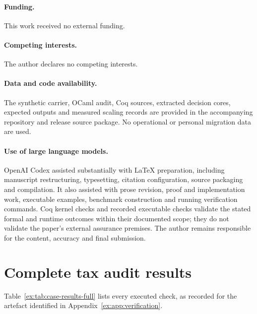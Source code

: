 \documentclass[smallextended,envcountsect,envcountsame,natbib]{svjour3}
\begin{document}
\paragraph{Funding.} This work received no external funding.
\paragraph{Competing interests.} The author declares no competing interests.
\paragraph{Data and code availability.} The synthetic carrier, OCaml audit, Coq sources, extracted decision cores, expected outputs and measured scaling records are provided in the accompanying repository and release source package. No operational or personal migration data are used.
\paragraph{Use of large language models.} OpenAI Codex assisted substantially with LaTeX preparation, including manuscript restructuring, typesetting, citation configuration, source packaging and compilation. It also assisted with prose revision, proof and implementation work, executable examples, benchmark construction and running verification commands. Coq kernel checks and recorded executable checks validate the stated formal and runtime outcomes within their documented scope; they do not validate the paper's external assurance premises. The author remains responsible for the content, accuracy and final submission.

\appendix

\section{Complete tax audit results}\label{ex:app:tax-results}
Table~\ref{ex:tab:case-results-full} lists every executed check, as recorded for the artefact identified in Appendix~\ref{ex:app:verification}.
\end{document}
